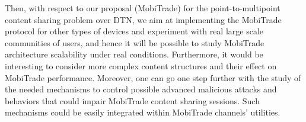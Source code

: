 Then, with respect to our proposal (MobiTrade) for the point-to-multipoint content sharing problem over DTN, we aim at implementing the MobiTrade protocol for other types of devices and experiment with real large scale communities of users, and hence it will be possible to study MobiTrade architecture scalability under real conditions. Furthermore, it would be interesting to consider more complex content structures and their effect on MobiTrade performance. Moreover, one can go one step further with the study of the needed mechanisms to control possible advanced malicious attacks and behaviors that could impair MobiTrade content sharing sessions. Such mechanisms could be easily integrated within MobiTrade channels' utilities.
    


